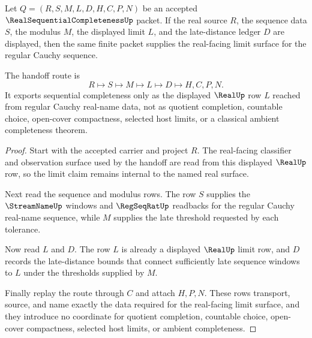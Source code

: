 \begin{theorem}
\label{thm:real-sequential-completeness-regular-cauchy-handoff}
Let $Q=(R,S,M,L,D,H,C,P,N)$ be an accepted $\RealSequentialCompletenessUp$ packet. If the real source $R$, the sequence data $S$, the modulus $M$, the displayed limit $L$, and the late-distance ledger $D$ are displayed, then the same finite packet supplies the real-facing limit surface for the regular Cauchy sequence.

The handoff route is
$$
R\longmapsto S\longmapsto M\longmapsto L\longmapsto D\longmapsto H,C,P,N .
$$
It exports sequential completeness only as the displayed $\RealUp$ row $L$ reached from regular Cauchy real-name data, not as quotient completion, countable choice, open-cover compactness, selected host limits, or a classical ambient completeness theorem.
\end{theorem}
\begin{proof}
Start with the accepted carrier and project $R$. The real-facing classifier and observation surface used by the handoff are read from this displayed $\RealUp$ row, so the limit claim remains internal to the named real surface.

Next read the sequence and modulus rows. The row $S$ supplies the $\StreamNameUp$ windows and $\RegSeqRatUp$ readbacks for the regular Cauchy real-name sequence, while $M$ supplies the late threshold requested by each tolerance.

Now read $L$ and $D$. The row $L$ is already a displayed $\RealUp$ limit row, and $D$ records the late-distance bounds that connect sufficiently late sequence windows to $L$ under the thresholds supplied by $M$.

Finally replay the route through $C$ and attach $H,P,N$. These rows transport, source, and name exactly the data required for the real-facing limit surface, and they introduce no coordinate for quotient completion, countable choice, open-cover compactness, selected host limits, or ambient completeness.
\end{proof}

